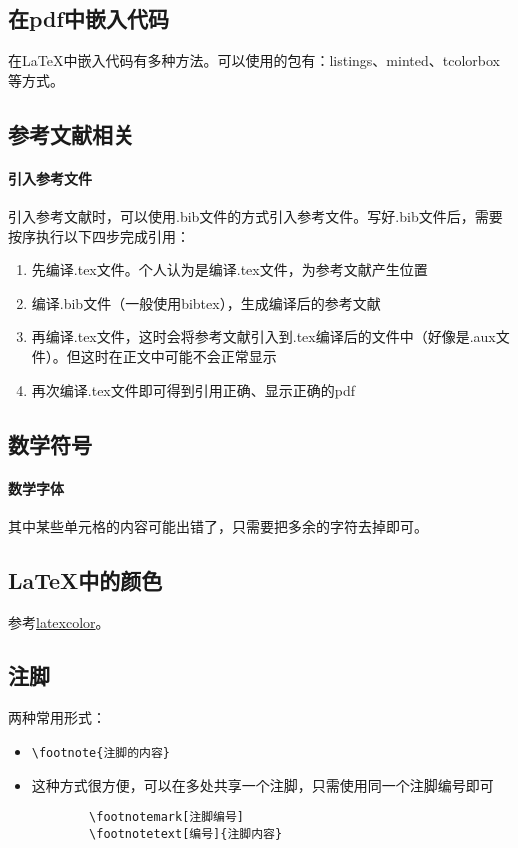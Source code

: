 \subsection{在pdf中嵌入代码}在\LaTeX 中嵌入代码有多种方法。可以使用的包有：listings、minted、tcolorbox等方式。

\subsection{参考文献相关}
\paragraph{引入参考文件}引入参考文献时，可以使用.bib文件的方式引入参考文件。写好.bib文件后，需要按序执行以下四步完成引用：
\begin{enumerate}
	\item 先编译.tex文件。个人认为是编译.tex文件，为参考文献产生位置
	\item 编译.bib文件（一般使用bibtex），生成编译后的参考文献
	\item 再编译.tex文件，这时会将参考文献引入到.tex编译后的文件中（好像是.aux文件）。但这时在正文中可能不会正常显示
	\item 再次编译.tex文件即可得到引用正确、显示正确的pdf
\end{enumerate}

\subsection{数学符号}
\paragraph{数学字体}其中某些单元格的内容可能出错了，只需要把多余的字符去掉即可。


\subsection{\LaTeX 中的颜色}
参考\href{http://latexcolor.com/}{latexcolor}。

\subsection{注脚}
两种常用形式：
\begin{itemize}
	\item \begin{verbatim}\footnote{注脚的内容}\end{verbatim}
	\item 这种方式很方便，可以在多处共享一个注脚，只需使用同一个注脚编号即可
	\begin{verbatim}
		\footnotemark[注脚编号]
		\footnotetext[编号]{注脚内容}
	\end{verbatim}
\end{itemize}

